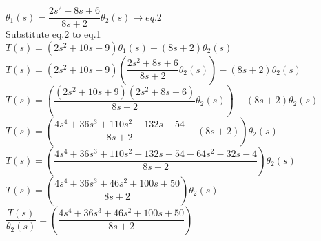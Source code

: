 \documentclass[11pt,letterpaper]{article}
\begin{document}
					$\theta_1(s)=\dfrac{2s^2+8s+6}{8s+2}\theta_2(s)  \rightarrow eq.2$\\

					Substitute eq.2 to eq.1\\

					$T(s)=(2s^2+10s+9)\theta_1(s)-(8s+2)\theta_2(s)$\\

					$T(s)=(2s^2+10s+9)\left(\dfrac{2s^2+8s+6}{8s+2}\theta_2(s)\right)-(8s+2)\theta_2(s)$\\

					$T(s)=\left(\dfrac{(2s^2+10s+9)(2s^2+8s+6)}{8s+2}\theta_2(s)\right)-(8s+2)\theta_2(s)$\\

					$T(s)=\left(\dfrac{4s^4+36s^3+110s^2+132s+54}{8s+2}-(8s+2)\right)\theta_2(s)$\\

					$T(s)=\left(\dfrac{4s^4+36s^3+110s^2+132s+54-64s^2-32s-4}{8s+2}\right)\theta_2(s)$\\

					$T(s)=\left(\dfrac{4s^4+36s^3+46s^2+100s+50}{8s+2}\right)\theta_2(s)$\\

					$\dfrac{T(s)}{\theta_2(s)}=\left(\dfrac{4s^4+36s^3+46s^2+100s+50}{8s+2}\right)$\\

					\\

			
\end{document}
